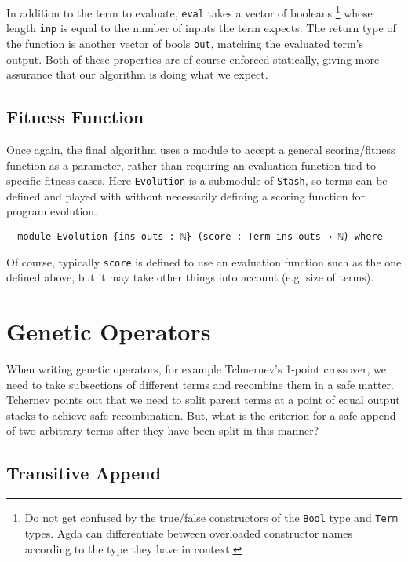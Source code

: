 \documentclass[runningheads,a4paper]{llncs}
\begin{document}
In addition to the term to evaluate, \texttt{eval} takes a vector of
booleans \footnote{Do not get confused by the true/false constructors
  of the \texttt{Bool} type and \texttt{Term} types. Agda can
  differentiate between overloaded constructor names according to the
  type they have in context.}
whose length \texttt{inp} is equal to the number of inputs the
term expects. The return type of the function is another vector of
bools \texttt{out}, matching the evaluated term's output. Both of these
properties are of course enforced statically, giving more assurance that
our algorithm is doing what we expect.

\subsection{Fitness Function}

Once again, the final algorithm uses a module to accept a general scoring/fitness
function as a parameter, rather than requiring an evaluation function
tied to specific fitness cases. Here \texttt{Evolution} is a submodule
of \texttt{Stash}, so terms can be defined and played with without
necessarily defining a scoring function for program evolution.

\begin{verbatim}
  module Evolution {ins outs : ℕ} (score : Term ins outs → ℕ) where
\end{verbatim}

Of course, typically \texttt{score} is defined to use an evaluation
function such as the one defined above, but it may take other things
into account (e.g. size of terms).

\section{Genetic Operators}

When writing genetic operators, for example
Tchnernev's \cite{tchernev:forthcross} 1-point crossover, we need to take
subsections of different terms and recombine them in a safe
matter. Tchernev points out that we need to split parent terms at a
point of equal output stacks to achieve safe recombination. But,
what is the criterion for a safe append of two arbitrary terms after
they have been split in this manner?

\subsection{Transitive Append}
\end{document}
